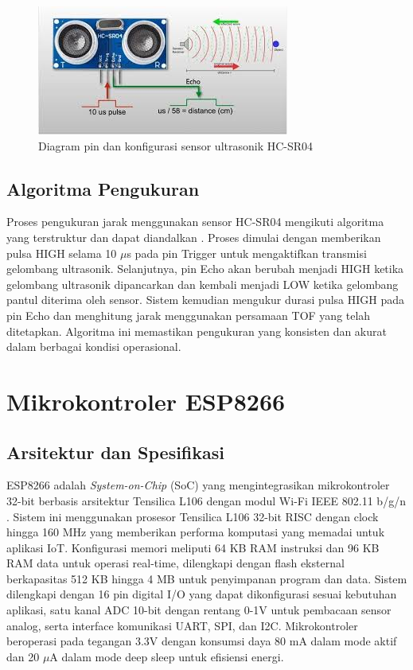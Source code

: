 \begin{figure}
    \centering
    \includegraphics[width=0.5\linewidth]{images/hcsr.jpg}
    \caption{Diagram pin dan konfigurasi sensor ultrasonik HC-SR04}
    \label{fig:teori-figure-2}
\end{figure}

\subsection{Algoritma Pengukuran}
Proses pengukuran jarak menggunakan sensor HC-SR04 mengikuti algoritma yang terstruktur dan dapat diandalkan \citep{rohman2021aplikasi}. Proses dimulai dengan memberikan pulsa HIGH selama 10 $\mu$s pada pin Trigger untuk mengaktifkan transmisi gelombang ultrasonik. Selanjutnya, pin Echo akan berubah menjadi HIGH ketika gelombang ultrasonik dipancarkan dan kembali menjadi LOW ketika gelombang pantul diterima oleh sensor. Sistem kemudian mengukur durasi pulsa HIGH pada pin Echo dan menghitung jarak menggunakan persamaan TOF yang telah ditetapkan. Algoritma ini memastikan pengukuran yang konsisten dan akurat dalam berbagai kondisi operasional.

\section{Mikrokontroler ESP8266}

\subsection{Arsitektur dan Spesifikasi}
ESP8266 adalah \textit{System-on-Chip} (SoC) yang mengintegrasikan mikrokontroler 32-bit berbasis arsitektur Tensilica L106 dengan modul Wi-Fi IEEE 802.11 b/g/n \citep{rodrigues2018vision}. Sistem ini menggunakan prosesor Tensilica L106 32-bit RISC dengan clock hingga 160 MHz yang memberikan performa komputasi yang memadai untuk aplikasi IoT. Konfigurasi memori meliputi 64 KB RAM instruksi dan 96 KB RAM data untuk operasi real-time, dilengkapi dengan flash eksternal berkapasitas 512 KB hingga 4 MB untuk penyimpanan program dan data. Sistem dilengkapi dengan 16 pin digital I/O yang dapat dikonfigurasi sesuai kebutuhan aplikasi, satu kanal ADC 10-bit dengan rentang 0-1V untuk pembacaan sensor analog, serta interface komunikasi UART, SPI, dan I2C. Mikrokontroler beroperasi pada tegangan 3.3V dengan konsumsi daya 80 mA dalam mode aktif dan 20 $\mu$A dalam mode deep sleep untuk efisiensi energi.

